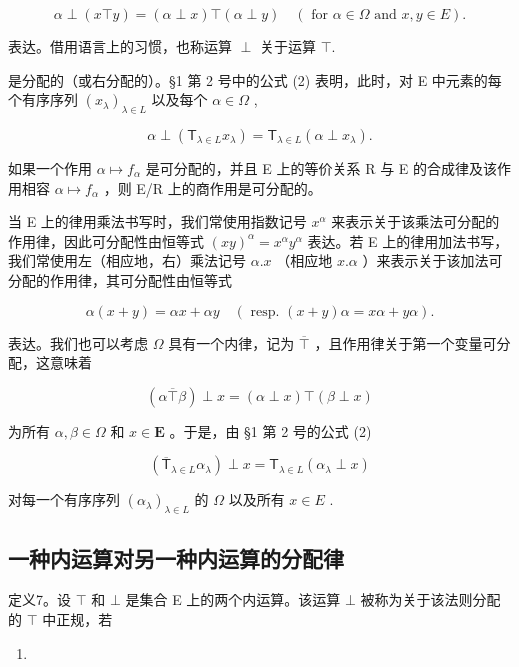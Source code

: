 \[
\alpha \perp (x \top y) = (\alpha \perp x) \top (\alpha \perp y) \quad (\text { for   } \alpha \in \Omega \text {   and   } x, y \in E).\tag{6}
\]

表达。借用语言上的习惯，也称运算 \(\perp\) 关于运算 \(\top\).

是分配的（或右分配的）。§1 第 2 号中的公式 (2) 表明，此时，对 E 中元素的每个有序序列 \((x_{\lambda})_{\lambda \in L}\) 以及每个 \(\alpha \in \Omega\) ,

\[
\alpha \perp \left(\mathsf {T} _ {\lambda \in L} x _ {\lambda}\right) = \mathsf {T} _ {\lambda \in L} (\alpha \perp x _ {\lambda}).\tag{7}
\]

如果一个作用 \(\alpha\mapsto f_{\alpha}\) 是可分配的，并且 E 上的等价关系 R 与 E 的合成律及该作用相容 \(\alpha\mapsto f_{\alpha}\) ，则 E/R 上的商作用是可分配的。

当 E 上的律用乘法书写时，我们常使用指数记号 \(x^{\alpha}\) 来表示关于该乘法可分配的作用律，因此可分配性由恒等式 \((xy)^{\alpha} = x^{\alpha}y^{\alpha}\) 表达。若 E 上的律用加法书写，我们常使用左（相应地，右）乘法记号 \(\alpha.x\) （相应地 \(x.\alpha\) ）来表示关于该加法可分配的作用律，其可分配性由恒等式

\[
\alpha (x + y) = \alpha x + \alpha y \quad (\text { resp. } (x + y) \alpha = x \alpha + y \alpha).
\]

表达。我们也可以考虑 \(\Omega\) 具有一个内律，记为 \(\overline{\top}\) ，且作用律关于第一个变量可分配，这意味着

\[
(\alpha \overline{\top} \beta) \perp x = (\alpha \perp x) \top (\beta \perp x)\tag{8}
\]

为所有 \(\alpha, \beta \in \Omega\) 和 \(x \in \mathbf{E}\) 。于是，由 §1 第 2 号的公式 (2)

\[
\left(\overline {{\mathsf {T}}} _ {\lambda \in L} \alpha_ {\lambda}\right) \perp x = \mathsf {T} _ {\lambda \in L} (\alpha_ {\lambda} \perp x)\tag{9}
\]

对每一个有序序列 \((\alpha_{\lambda})_{\lambda \in L}\) 的 \(\Omega\) 以及所有 \(x\in E\) .

\subsection{一种内运算对另一种内运算的分配律}

定义7。设 \(\top\) 和 \(\bot\) 是集合 E 上的两个内运算。该运算 \(\bot\) 被称为关于该法则分配的 \(\top\) 中正规，若

\begin{enumerate}
\def\labelenumi{(\arabic{enumi})}
\setcounter{enumi}{9}
\tightlist
\item
\end{enumerate}

